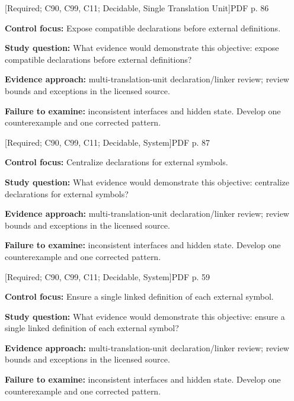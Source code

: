 \documentclass[10pt,letterpaper]{article}
\begin{document}
\smallskip
{}
 \textsf{\footnotesize [Required; C90, C99, C11; Decidable, Single Translation Unit]}\hfill{\footnotesize PDF p. 86}\par
\textbf{Control focus:} Expose compatible declarations before external definitions.\par
\textbf{Study question:} What evidence would demonstrate this objective: expose compatible declarations before external definitions?\par
\textbf{Evidence approach:} multi-translation-unit declaration/linker review; review bounds and exceptions in the licensed source.\par
\textbf{Failure to examine:} inconsistent interfaces and hidden state. Develop one counterexample and one corrected pattern.\par
\smallskip
{}
 \textsf{\footnotesize [Required; C90, C99, C11; Decidable, System]}\hfill{\footnotesize PDF p. 87}\par
\textbf{Control focus:} Centralize declarations for external symbols.\par
\textbf{Study question:} What evidence would demonstrate this objective: centralize declarations for external symbols?\par
\textbf{Evidence approach:} multi-translation-unit declaration/linker review; review bounds and exceptions in the licensed source.\par
\textbf{Failure to examine:} inconsistent interfaces and hidden state. Develop one counterexample and one corrected pattern.\par
\smallskip
{}
 \textsf{\footnotesize [Required; C90, C99, C11; Decidable, System]}\hfill{\footnotesize PDF p. 59}\par
\textbf{Control focus:} Ensure a single linked definition of each external symbol.\par
\textbf{Study question:} What evidence would demonstrate this objective: ensure a single linked definition of each external symbol?\par
\textbf{Evidence approach:} multi-translation-unit declaration/linker review; review bounds and exceptions in the licensed source.\par
\textbf{Failure to examine:} inconsistent interfaces and hidden state. Develop one counterexample and one corrected pattern.\par
\end{document}
